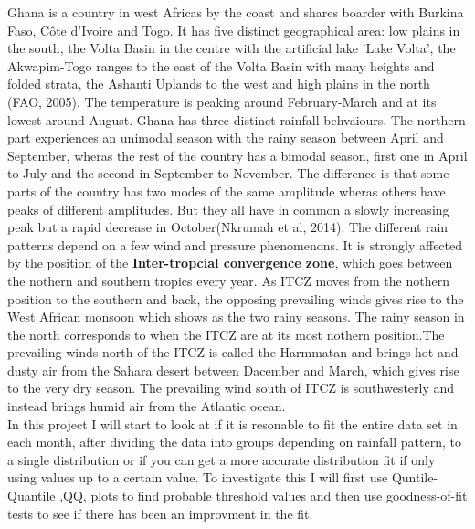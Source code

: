 \documentclass{article}
\begin{document}
	Ghana is a country in west Africas by the coast and shares boarder with Burkina Faso, C\^{o}te d'Ivoire and Togo. It has five distinct geographical area: low plains in the south, the Volta Basin in the centre with the artificial lake 'Lake Volta', the Akwapim-Togo ranges to the east of the Volta Basin with many heights and folded strata, the Ashanti Uplands to the west and high plains in the north (FAO, 2005). The temperature is peaking around February-March and at its lowest around August. Ghana has three distinct rainfall behvaiours. The northern part experiences an unimodal season with the rainy season between April and September, wheras the rest of the country has a bimodal season, first one in April to July and the second in September to November. The difference is that some parts of the country has two modes of the same amplitude wheras others have peaks of different amplitudes. But they all have in common a slowly increasing peak but a rapid decrease in October(Nkrumah et al, 2014). The different rain patterns depend on a few wind and pressure phenomenons. It is strongly affected by the  position of the \textbf{Inter-tropcial convergence zone}, which goes between the nothern and southern tropics every year. As ITCZ moves from the nothern position to the southern and back, the opposing prevailing winds gives rise to the West African monsoon which shows as the two rainy seasons. The rainy season in the north corresponds to when the ITCZ are at its most nothern position.The prevailing winds north of the ITCZ is called the Harmmatan and brings hot and dusty air from the Sahara desert between Dacember and March, which gives rise to the very dry season. The prevailing wind south of ITCZ is southwesterly and instead brings humid air from the Atlantic ocean.\\
	
	In this project I will start to look at if it is resonable to fit the entire data set in each month, after dividing the data into groups depending on rainfall pattern, to a single distribution or if you can get a more accurate distribution fit if only using values up to a certain value. To investigate this I will first use Quntile-Quantile ,QQ, plots to find probable threshold values and then use goodness-of-fit tests to see if there has been an improvment in the fit. 
	
\end{document}
